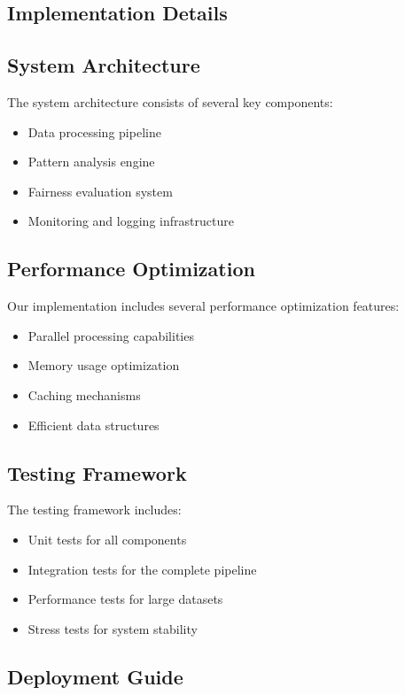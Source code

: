 \documentclass[12pt]{article}
\begin{document}
\begin{appendices}
\section{Implementation Details}

\subsection{System Architecture}

The system architecture consists of several key components:
\begin{itemize}
    \item Data processing pipeline
    \item Pattern analysis engine
    \item Fairness evaluation system
    \item Monitoring and logging infrastructure
\end{itemize}

\subsection{Performance Optimization}

Our implementation includes several performance optimization features:
\begin{itemize}
    \item Parallel processing capabilities
    \item Memory usage optimization
    \item Caching mechanisms
    \item Efficient data structures
\end{itemize}

\subsection{Testing Framework}

The testing framework includes:
\begin{itemize}
    \item Unit tests for all components
    \item Integration tests for the complete pipeline
    \item Performance tests for large datasets
    \item Stress tests for system stability
\end{itemize}

\subsection{Deployment Guide}


\end{appendices}
\end{document}
